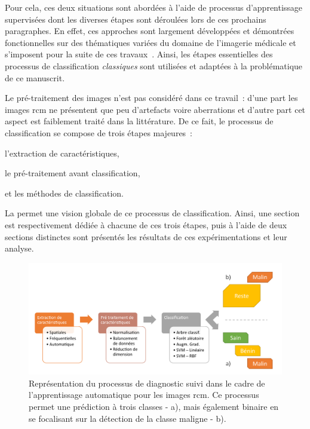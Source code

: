Pour cela, ces deux situations sont abordées à l'aide de processus d'apprentissage supervisées dont les diverses étapes sont déroulées lors de ces prochains paragraphes. En effet, ces approches sont largement développées et démontrées fonctionnelles sur des thématiques variées du domaine de l'imagerie médicale et s'imposent pour la suite de ces travaux~\cite{Litjens2017,Pathan2018}. Ainsi, les étapes essentielles des processus de classification \textit{classiques} sont utilisées et adaptées à la problématique de ce manuscrit.\par

Le pré-traitement des images n'est pas considéré dans ce travail~: d'une part les images \gls{rcm} ne présentent que peu d'artefacts voire aberrations et d'autre part cet aspect est faiblement traité dans la littérature. De ce fait, le processus de classification se compose de trois étapes majeures~:
\begin{inlinerate}
    \item l'extraction de caractéristiques,
    \item le pré-traitement avant classification,
    \item et les méthodes de classification.
\end{inlinerate} La  permet une vision globale de ce processus de classification. Ainsi, une section est respectivement dédiée à chacune de ces trois étapes, puis à l'aide de deux sections distinctes sont présentés les résultats de ces expérimentations et leur analyse.\par

\begin{figure}[H]
\centering
    \includegraphics[width=\linewidth]{contents/chapter_5/resources/scheme_macro_image_classification.pdf}
    \caption{Représentation du processus de diagnostic suivi dans le cadre de l'apprentissage automatique pour les images \gls{rcm}. Ce processus permet une prédiction à trois classes - a), mais également binaire en se focalisant sur la détection de la classe maligne - b).}
    \label{fig:scheme_macro_image_classification}
\end{figure}\par

